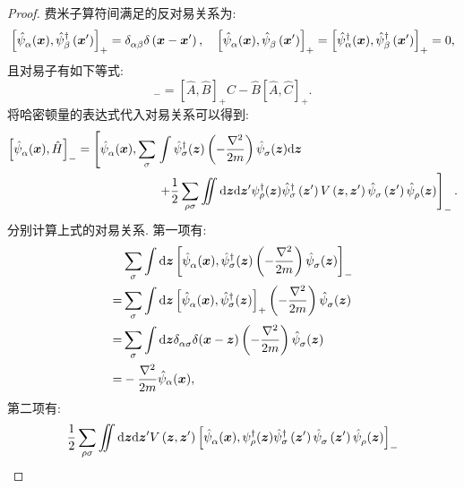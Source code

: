 \begin{proof}
费米子算符间满足的反对易关系为:
\begin{equation}
\left[\hat{\psi}^{ }_\alpha(\boldsymbol{x}), \hat{\psi}_\beta^{\dagger}\left(\boldsymbol{x}^{\prime}\right)\right]_{+}=\delta^{ }_{\alpha \beta} \delta\left(\boldsymbol{x}-\boldsymbol{x}^{\prime}\right), \quad\left[\hat{\psi}^{ }_\alpha(\boldsymbol{x}), \hat{\psi}^{ }_\beta\left(\boldsymbol{x}^{\prime}\right)\right]_{+}=\left[\hat{\psi}_\alpha^{\dagger}(\boldsymbol{x}), \hat{\psi}_\beta^{\dagger}\left(\boldsymbol{x}^{\prime}\right)\right]_{+}=0,
\end{equation}
且对易子有如下等式:
\begin{equation}
[\hat{A}, \hat{B} \hat{C}]_{-}=[\hat{A}, \hat{B}]_{+} \hat{C}-\hat{B}[\hat{A}, \hat{C}]_{+} .
\end{equation}
将哈密顿量的表达式代入对易关系可以得到:
\begin{align}
{\left[\hat{\psi}^{ }_\alpha(\boldsymbol{x}), \hat{H}\right]_{-}=\left[\hat{\psi}^{ }_\alpha(\boldsymbol{x}), \sum_\sigma\right.} & \int \hat{\psi}_\sigma^{\dagger}(\boldsymbol{z})\left(-\frac{\nabla^2}{2 m}\right) \hat{\psi}^{ }_\sigma(\boldsymbol{z}) \mathrm{d} \boldsymbol{z} \nonumber\\
& \left.+\frac{1}{2} \sum_{\rho \sigma} \iint \mathrm{d} \boldsymbol{z} \mathrm{d} \boldsymbol{z}^{\prime} \psi_\rho^{\dagger}(\boldsymbol{z}) \hat{\psi}_\sigma^{\dagger}\left(\boldsymbol{z}^{\prime}\right) V\left(\boldsymbol{z}, \boldsymbol{z}^{\prime}\right) \hat{\psi}^{ }_\sigma\left(\boldsymbol{z}^{\prime}\right) \hat{\psi}^{ }_\rho(\boldsymbol{z})\right]_- .
\end{align}
分别计算上式的对易关系. 第一项有:
\begin{align}
& \sum_\sigma \int \mathrm{d} \boldsymbol{z}\left[\hat{\psi}^{ }_\alpha(\boldsymbol{x}), \hat{\psi}_\sigma^{\dagger}(\boldsymbol{z})\left(-\frac{\nabla^2}{2 m}\right) \hat{\psi}^{ }_\sigma(\boldsymbol{z})\right]_{-} \nonumber\\
=& \sum_\sigma \int \mathrm{d} \boldsymbol{z}\left[\hat{\psi}^{ }_\alpha(\boldsymbol{x}), \hat{\psi}_\sigma^{\dagger}(\boldsymbol{z})\right]_{+}\left(-\frac{\nabla^2}{2 m}\right) \hat{\psi}^{ }_\sigma(\boldsymbol{z}) \nonumber\\
=& \sum_\sigma \int \mathrm{d} \boldsymbol{z} \delta^{ }_{\alpha \sigma} \delta(\boldsymbol{x}-\boldsymbol{z})\left(-\frac{\nabla^2}{2 m}\right) \hat{\psi}^{ }_\sigma(\boldsymbol{z})\nonumber\\
=& -\frac{\nabla^2}{2 m} \hat{\psi}_\alpha(\boldsymbol{x}) ,
\end{align}
第二项有:
\begin{align}
& \frac{1}{2} \sum_{\rho \sigma} \iint \mathrm{d} \vct{z} \mathrm{d} \vct{z}^{\prime} V\left(\vct{z}, \vct{z}^{\prime}\right)\left[\hat{\psi}^{ }_\alpha(\vct{x}), \psi_\rho^{\dg}(\vct{z}) \hat{\psi}_\sigma^{\dg}\left(\vct{z}^{\prime}\right) \hat{\psi}^{ }_\sigma\left(\vct{z}^{\prime}\right) \hat{\psi}^{ }_\rho(\vct{z})\right]_- \nonumber\\

\end{align}
\end{proof}
